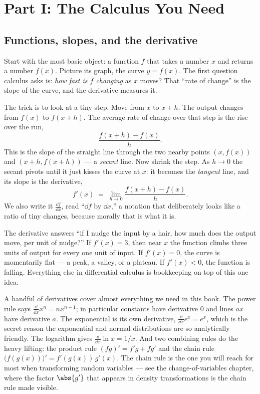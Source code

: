 \section{Part I: The Calculus You Need}
\label{chAcla:calc-intro}

\subsection{Functions, slopes, and the derivative}
\label{chAcla:derivative}

Start with the most basic object: a function $f$ that takes a number $x$ and returns a number $f(x)$.
Picture its graph, the curve $y=f(x)$. The first question calculus asks is: \emph{how fast is $f$
changing} as $x$ moves? That ``rate of change'' is the slope of the curve, and the derivative measures
it.

The trick is to look at a tiny step. Move from $x$ to $x+h$. The output changes from $f(x)$ to
$f(x+h)$. The average rate of change over that step is the rise over the run,
\[
  \frac{f(x+h)-f(x)}{h}.
\]
This is the slope of the straight line through the two nearby points $(x,f(x))$ and $(x+h, f(x+h))$
--- a \emph{secant} line. Now shrink the step. As $h\to 0$ the secant pivots until it just kisses the
curve at $x$: it becomes the \emph{tangent} line, and its slope is the derivative,
\[
  f'(x) \;=\; \lim_{h\to 0}\frac{f(x+h)-f(x)}{h}.
\]
We also write it $\frac{\dd f}{\dd x}$, read ``$\dd f$ by $\dd x$,'' a notation that deliberately
looks like a ratio of tiny changes, because morally that is what it is.

\begin{intuitionbox}
The derivative answers ``if I nudge the input by a hair, how much does the output move, per unit of
nudge?'' If $f'(x)=3$, then near $x$ the function climbs three units of output for every one unit of
input. If $f'(x)=0$, the curve is momentarily flat --- a peak, a valley, or a plateau. If $f'(x)<0$,
the function is falling. Everything else in differential calculus is bookkeeping on top of this one
idea.
\end{intuitionbox}

A handful of derivatives cover almost everything we need in this book. The power rule says
$\frac{\dd}{\dd x}x^n = n x^{n-1}$; in particular constants have derivative $0$ and lines $ax$ have
derivative $a$. The exponential is its own derivative, $\frac{\dd}{\dd x}e^{x}=e^{x}$, which is the
secret reason the exponential and normal distributions are so analytically friendly. The logarithm
gives $\frac{\dd}{\dd x}\ln x = 1/x$. And two combining rules do the heavy lifting: the product rule
$(fg)'=f'g+fg'$ and the chain rule $\big(f(g(x))\big)' = f'(g(x))\,g'(x)$. The chain rule is the one
you will reach for most when transforming random variables --- see the change-of-variables chapter,
where the factor $\abs{g'}$ that appears in density transformations is the chain rule made visible.

